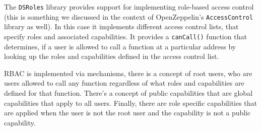 The \texttt{DSRoles} library provides support for implementing
role-based access control (this is something we discussed in the context
of OpenZeppelin's \texttt{AccessControl} library as well). In this case
it implements different access control lists, that specify roles and
associated capabilities. It provides a \texttt{canCall()} function that
determines, if a user is allowed to call a function at a particular
address by looking up the roles and capabilities defined in the access
control list.

RBAC is implemented via mechanisms, there is a concept of root users,
who are users allowed to call any function regardless of what roles and
capabilities are defined for that function. There's a concept of public
capabilities that are global capabilities that apply to all users.
Finally, there are role specific capabilities that are applied when the
user is not the root user and the capability is not a public capability.
